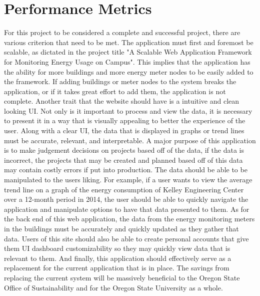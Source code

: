\documentclass[onecolumn, draftclsnofoot,10pt, compsoc]{IEEEtran}
\begin{document}
\section{Performance Metrics}
	For this project to be considered a complete and successful project, there are various criterion that need to be met. The application must first and 
	foremost be scalable, as dictated in the project title "A Scalable Web Application Framework for Monitoring Energy Usage on Campus". This implies that the
	application has the ability for more buildings and more energy meter nodes to be easily added to the framework. If adding buildings or meter nodes to the
	system breaks the application, or if it takes great effort to add them, the application is not complete. Another trait that the website should have is 
	a intuitive and clean looking UI. Not only is it important to process and view the data, it is necessary to present it in a way that is visually appealing
	to better the experience of the user. Along with a clear UI, the data that is displayed in graphs or trend lines must be accurate, relevant, and interpretable.
	A major purpose of this application is to make judgement decisions on projects based off of the data, if the data is incorrect, the projects that may be created
	and planned based off of this data may contain costly errors if put into production. The data should be able to be manipulated to the users liking. For example, 
	if a user wants to view the average trend line on a graph of the energy consumption of Kelley Engineering Center over a 12-month period in 2014, the user should
	be able to quickly navigate the application and manipulate options to have that data presented to them. As for the back end of this web application, the data 
	from the energy monitoring meters in the buildings must be accurately and quickly updated as they gather that data. Users of this site should also be able to 
	create personal accounts that give them UI dashboard customizability so they may quickly view data that is relevant to them. And finally, this application should
	effectively serve as a replacement for the current application that is in place. The savings from replacing the current system will be massively beneficial to 
	the Oregon State Office of Sustainability and for the Oregon State University as a whole.
	
\end{document}
